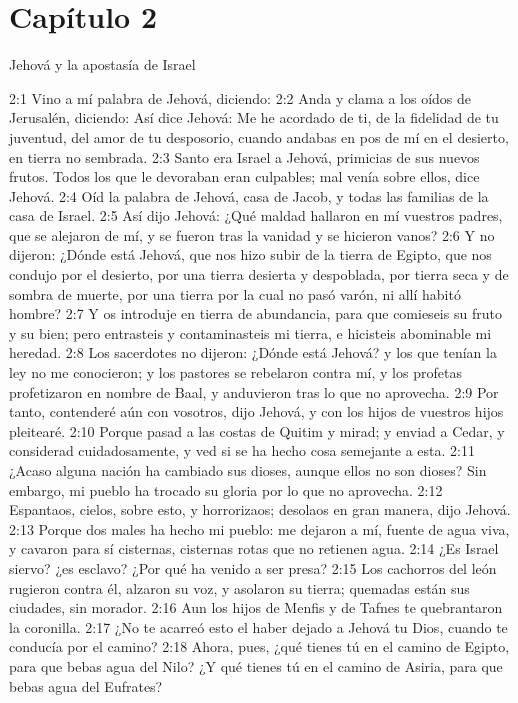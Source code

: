 \section*{Capítulo 2 }
Jehová y la apostasía de Israel 
 
2:1 Vino a mí palabra de Jehová, diciendo: 
2:2 Anda y clama a los oídos de Jerusalén, diciendo: Así dice Jehová: Me he acordado de ti, de la fidelidad de tu juventud, del amor de tu desposorio, cuando andabas en pos de mí en el desierto, en tierra no sembrada. 
2:3 Santo era Israel a Jehová, primicias de sus nuevos frutos. Todos los que le devoraban eran culpables; mal venía sobre ellos, dice Jehová. 
2:4 Oíd la palabra de Jehová, casa de Jacob, y todas las familias de la casa de Israel. 
2:5 Así dijo Jehová: ¿Qué maldad hallaron en mí vuestros padres, que se alejaron de mí, y se fueron tras la vanidad y se hicieron vanos? 
2:6 Y no dijeron: ¿Dónde está Jehová, que nos hizo subir de la tierra de Egipto, que nos condujo por el desierto, por una tierra desierta y despoblada, por tierra seca y de sombra de muerte, por una tierra por la cual no pasó varón, ni allí habitó hombre? 
2:7 Y os introduje en tierra de abundancia, para que comieseis su fruto y su bien; pero entrasteis y contaminasteis mi tierra, e hicisteis abominable mi heredad. 
2:8 Los sacerdotes no dijeron: ¿Dónde está Jehová? y los que tenían la ley no me conocieron; y los pastores se rebelaron contra mí, y los profetas profetizaron en nombre de Baal, y anduvieron tras lo que no aprovecha. 
2:9 Por tanto, contenderé aún con vosotros, dijo Jehová, y con los hijos de vuestros hijos pleitearé. 
2:10 Porque pasad a las costas de Quitim y mirad; y enviad a Cedar, y considerad cuidadosamente, y ved si se ha hecho cosa semejante a esta. 
2:11 ¿Acaso alguna nación ha cambiado sus dioses, aunque ellos no son dioses? Sin embargo, mi pueblo ha trocado su gloria por lo que no aprovecha. 
2:12 Espantaos, cielos, sobre esto, y horrorizaos; desolaos en gran manera, dijo Jehová. 
2:13 Porque dos males ha hecho mi pueblo: me dejaron a mí, fuente de agua viva, y cavaron para sí cisternas, cisternas rotas que no retienen agua. 
2:14 ¿Es Israel siervo? ¿es esclavo? ¿Por qué ha venido a ser presa? 
2:15 Los cachorros del león rugieron contra él, alzaron su voz, y asolaron su tierra; quemadas están sus ciudades, sin morador. 
2:16 Aun los hijos de Menfis y de Tafnes te quebrantaron la coronilla. 
2:17 ¿No te acarreó esto el haber dejado a Jehová tu Dios, cuando te conducía por el camino? 
2:18 Ahora, pues, ¿qué tienes tú en el camino de Egipto, para que bebas agua del Nilo? ¿Y qué tienes tú en el camino de Asiria, para que bebas agua del Eufrates? 
